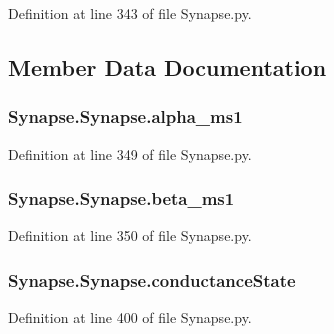 Definition at line 343 of file Synapse.\+py.



\subsection{Member Data Documentation}
\subsubsection[{\texorpdfstring{alpha\+\_\+ms1}{alpha_ms1}}]{\setlength{\rightskip}{0pt plus 5cm}Synapse.\+Synapse.\+alpha\+\_\+ms1}\hypertarget{class_synapse_1_1_synapse_ae15502cd5d5604d38328b2b1432477d7}{}\label{class_synapse_1_1_synapse_ae15502cd5d5604d38328b2b1432477d7}


Definition at line 349 of file Synapse.\+py.

\subsubsection[{\texorpdfstring{beta\+\_\+ms1}{beta_ms1}}]{\setlength{\rightskip}{0pt plus 5cm}Synapse.\+Synapse.\+beta\+\_\+ms1}\hypertarget{class_synapse_1_1_synapse_ab59f413cbd21555531be209dee307a97}{}\label{class_synapse_1_1_synapse_ab59f413cbd21555531be209dee307a97}


Definition at line 350 of file Synapse.\+py.

\subsubsection[{\texorpdfstring{conductance\+State}{conductanceState}}]{\setlength{\rightskip}{0pt plus 5cm}Synapse.\+Synapse.\+conductance\+State}\hypertarget{class_synapse_1_1_synapse_a89d3762daa9c60be63403a5ce9fd9a84}{}\label{class_synapse_1_1_synapse_a89d3762daa9c60be63403a5ce9fd9a84}


Definition at line 400 of file Synapse.\+py.

